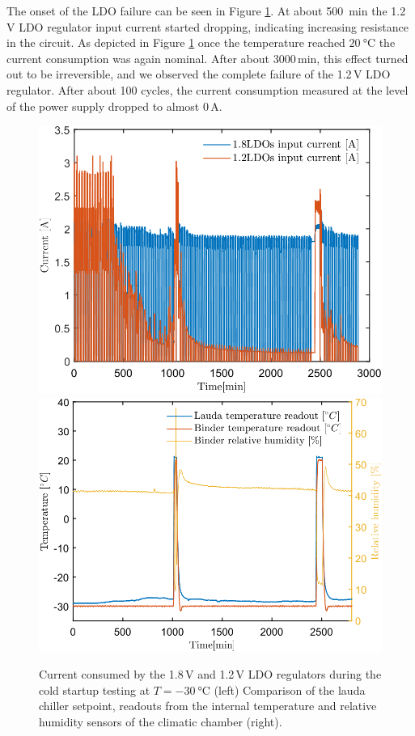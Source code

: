 \begin{table}[!h]
\centering
\caption{Detailed description of the \gls{LDO} failure with regard to the type and number of cycles.}
\label{tab:SetA}
\end{table}
The onset of the \gls{LDO} failure can be seen in Figure \ref{fig_cold_startup}. At about \SI{500}{\minute} the 1.2\,V LDO regulator input current started dropping, indicating increasing resistance in the circuit. As depicted in Figure \ref{fig_cold_startup} once the temperature reached $\SI{20}{\celsius}$ the current consumption was again nominal. After about  3000\,min, this effect turned out to be irreversible, and we observed the complete failure of the 1.2\,V \gls{LDO} regulator. After about 100 cycles, the current consumption measured at the level of the power supply dropped to almost 0\,A. 
\begin{figure}[!h]
\centering
\includegraphics[width=0.46\columnwidth]{Chapter4/images/currents_long.png}
\includegraphics[width=0.48\columnwidth]{Chapter4/images/cycling.png}
\caption{Current consumed by the 1.8\,V and 1.2\,V \gls{LDO} regulators during the cold startup testing at $T = \SI{-30}{\celsius}$ (left)
Comparison of the lauda chiller setpoint, readouts from the internal temperature and relative humidity sensors of the climatic chamber (right).}
\label{fig_cold_startup}
\end{figure}

